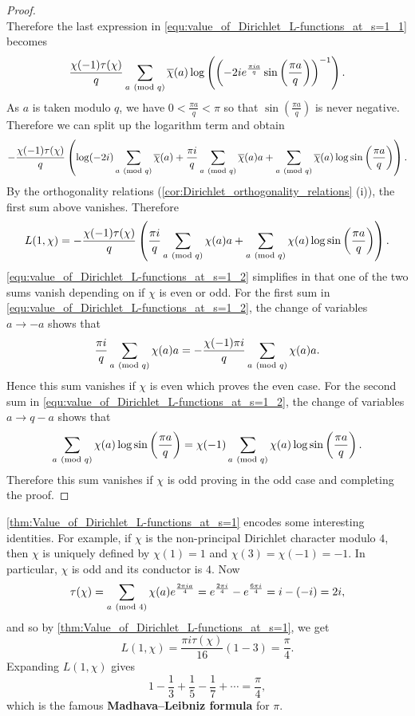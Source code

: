 \begin{proof}
\[      \]
      Therefore the last expression in \cref{equ:value_of_Dirichlet_L-functions_at_s=1_1} becomes
      \[
        \frac{\chi(-1)\tau(\chi)}{q}\sum_{a \ \left(\text{mod }q\right)}\overline{\chi}(a)\log\left(\left(-2ie^{\frac{\pi ia}{q}}\sin\left(\frac{\pi a}{q}\right)\right)^{-1}\right).
      \]
      As $a$ is taken modulo $q$, we have $0 < \frac{\pi a}{q} < \pi$ so that $\sin\left(\frac{\pi a}{q}\right)$ is never negative. Therefore we can split up the logarithm term and obtain
      \[
        -\frac{\chi(-1)\tau(\chi)}{q}\left(\log(-2i)\sum_{a \ \left(\text{mod }q\right)}\overline{\chi}(a)+\frac{\pi i}{q}\sum_{a \ \left(\text{mod }q\right)}\overline{\chi}(a)a+\sum_{a \ \left(\text{mod }q\right)}\overline{\chi}(a)\log\sin\left(\frac{\pi a}{q}\right)\right).
      \]
      By the orthogonality relations (\cref{cor:Dirichlet_orthogonality_relations} (i)), the first sum above vanishes. Therefore
      \begin{equation}\label{equ:value_of_Dirichlet_L-functions_at_s=1_2}
        L(1,\chi) = -\frac{\chi(-1)\tau(\chi)}{q}\left(\frac{\pi i}{q}\sum_{a \ \left(\text{mod }q\right)}\chi(a)a+\sum_{a \ \left(\text{mod }q\right)}\chi(a)\log\sin\left(\frac{\pi a}{q}\right)\right).
      \end{equation}
      \cref{equ:value_of_Dirichlet_L-functions_at_s=1_2} simplifies in that one of the two sums vanish depending on if $\chi$ is even or odd. For the first sum in \cref{equ:value_of_Dirichlet_L-functions_at_s=1_2}, the change of variables $a \to -a$ shows that
      \[
        \frac{\pi i}{q}\sum_{a \ \left(\text{mod }q\right)}\chi(a)a = -\frac{\chi(-1)\pi i}{q}\sum_{a \ \left(\text{mod }q\right)}\chi(a)a.
      \]
      Hence this sum vanishes if $\chi$ is even which proves the even case. For the second sum in \cref{equ:value_of_Dirichlet_L-functions_at_s=1_2}, the change of variables $a \to q-a$ shows that
      \[
        \sum_{a \ \left(\text{mod }q\right)}\chi(a)\log\sin\left(\frac{\pi a}{q}\right) = \chi(-1)\sum_{a \ \left(\text{mod }q\right)}\chi(a)\log\sin\left(\frac{\pi a}{q}\right).
      \]
      Therefore this sum vanishes if $\chi$ is odd proving in the odd case and completing the proof.
    \end{proof}
    
    \begin{remark}
      \cref{thm:Value_of_Dirichlet_L-functions_at_s=1} encodes some interesting identities. For example, if $\chi$ is the non-principal Dirichlet character modulo $4$, then $\chi$ is uniquely defined by $\chi(1) = 1$ and $\chi(3) = \chi(-1) = -1$. In particular, $\chi$ is odd and its conductor is $4$. Now
      \[
        \tau(\chi) = \sum_{a \ \left(\text{mod }4\right)}\chi(a)e^{\frac{2\pi ia}{4}} = e^{\frac{2\pi i}{4}}-e^{\frac{6\pi i}{4}} = i-(-i) = 2i,
      \]
      and so by \cref{thm:Value_of_Dirichlet_L-functions_at_s=1}, we get
      \[
        L(1,\chi) = \frac{\pi i\tau(\chi)}{16}(1-3) = \frac{\pi}{4}.
      \]
      Expanding $L(1,\chi)$ gives
      \[
        1-\frac{1}{3}+\frac{1}{5}-\frac{1}{7}+\cdots = \frac{\pi}{4},
      \]
      which is the famous \textbf{Madhava–Leibniz formula} for $\pi$.
    \end{remark}

